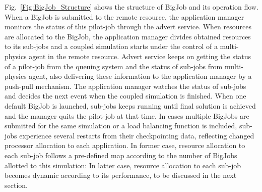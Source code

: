 \documentclass[conference,final]{IEEEtran}
\newcommand{\skonote}[1]{ {\textcolor{blue} { ***Jeff: #1 }}}
\newcommand{\skonote}[1]{}
\begin{document}


Fig.~\ref{Fig:BigJob_Structure} shows the structure of BigJob and its
operation flow. When a BigJob is submitted to the remote resource, the
application manager monitors the status of this pilot-job through the
advert service. When resources are allocated to the BigJob, the
application manager divides obtained resources to its sub-jobs and a
coupled simulation starts under the control of a multi-physics agent
in the remote resource. Advert service keeps on getting the status of
a pilot-job from the queuing system and the status of sub-jobs from
multi-physics agent, also delivering these information to the
application manager by a push-pull mechanism. The application manager
watches the status of sub-jobs and decides the next event when the
coupled simulation is finished. When one default BigJob is launched,
sub-jobs keeps running until final solution is achieved and the
manager quits the pilot-job at that time. In cases multiple BigJobs
are submitted for the same simulation or a load balancing function is
included, sub-jobs experience several restarts from their
checkpointing data, reflecting changed processor allocation to each
application. In former case, resource allocation to each sub-job
follows a pre-defined map according to the number of BigJobs allotted
to this simulation: In latter case, resource allocation to each
sub-job becomes dynamic according to its performance, to be discussed
in the next section.
\end{document}
